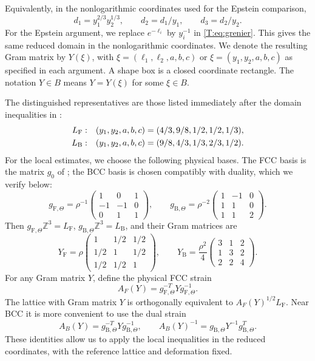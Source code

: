 \documentclass[reqno,english]{amsart}
\theoremstyle{definition}
\newtheorem{open problem}[theorem]{Open Problem}
\theoremstyle{remark}
\theoremstyle{plain}
\numberwithin{equation}{section}
\newcommand{\Z}{\mathbb Z}
\newcommand{\FCC}{L_{\mathrm F}}
\newcommand{\B}{L_{\mathrm B}}
\newcommand{\BCC}{\B}
\newcommand{\YB}{Y_{\mathrm B}}
\newcommand{\YF}{Y_{\mathrm F}}
\newcommand{\gFT}{g_{\mathrm F,\Theta}}
\newcommand{\gBT}{g_{\mathrm B,\Theta}}
\begin{document}
Equivalently, in the nonlogarithmic coordinates used for the Epstein
comparison,
\[
 d_1=y_1^{2/3}y_2^{1/3},\qquad d_2=d_1/y_1,\qquad d_3=d_2/y_2.
\]
For the Epstein argument, we replace $e^{-\ell_i}$ by $y_i^{-1}$ in
\eqref{T:eq:grenier}. This gives the same reduced domain in the
nonlogarithmic coordinates. We denote the resulting Gram matrix by
$Y(\xi)$, with $\xi=(\ell_1,\ell_2,a,b,c)$ or
$\xi=(y_1,y_2,a,b,c)$ as specified in each argument. A shape box is a
closed coordinate rectangle. The notation $Y\in B$ means
$Y=Y(\xi)$ for some $\xi\in B$.


The distinguished representatives are those listed immediately after
the domain inequalities in \cite[Section~4, p.~15]{SS}:
\begin{align}\label{T:eq:reps}
 \FCC:&\quad (y_1,y_2,a,b,c)=(4/3,9/8,1/2,1/2,1/3),\notag\\
 \BCC:&\quad (y_1,y_2,a,b,c)=(9/8,4/3,1/3,2/3,1/2).
\end{align}
For the local estimates, we choose the following physical bases. The
FCC basis is the matrix $g_0$ of \cite[Section~4, p.~17]{SS}; the BCC
basis is chosen compatibly with duality, which we verify below:
\begin{equation}\label{T:eq:bases}
 \gFT=\rho^{-1}\begin{pmatrix}1&0&1\\-1&-1&0\\0&1&1\end{pmatrix},\qquad
 \gBT=\rho^{-2}\begin{pmatrix}1&-1&0\\1&1&0\\1&1&2\end{pmatrix}.
\end{equation}
Then $\gFT\Z^3=\FCC$, $\gBT\Z^3=\BCC$, and their Gram matrices are
\begin{equation}\label{T:eq:grams}
 \YF=\rho\begin{pmatrix}1&1/2&1/2\\1/2&1&1/2\\1/2&1/2&1\end{pmatrix},\qquad
 \YB=\frac{\rho^2}{4}\begin{pmatrix}3&1&2\\1&3&2\\2&2&4\end{pmatrix}.
\end{equation}
For any Gram matrix $Y$, define the physical FCC strain
\begin{equation}\label{T:eq:AF}
 A_F(Y)=\gFT^{-T}Y\gFT^{-1}.
\end{equation}
The lattice with Gram matrix $Y$ is orthogonally equivalent to $A_F(Y)^{1/2}\FCC$. Near BCC it is more convenient to use the dual strain
\begin{equation}\label{T:eq:ABinv}
 A_B(Y)=\gBT^{-T}Y\gBT^{-1},\qquad
 A_B(Y)^{-1}=\gBT Y^{-1}\gBT^T.
\end{equation}
These identities allow us to apply the local inequalities in the
reduced coordinates, with the reference lattice and deformation fixed.
\end{document}
